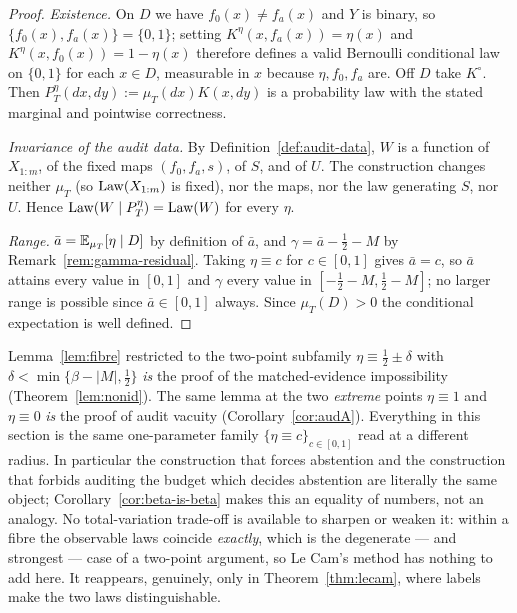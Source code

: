 \begin{proof}
\emph{Existence.} On $D$ we have $f_0(x)\neq f_a(x)$ and $Y$ is binary, so
$\{f_0(x),f_a(x)\}=\{0,1\}$; setting $K^\eta(x,f_a(x))=\eta(x)$ and
$K^\eta(x,f_0(x))=1-\eta(x)$ therefore defines a valid Bernoulli conditional law on
$\{0,1\}$ for each $x\in D$, measurable in $x$ because $\eta,f_0,f_a$ are. Off $D$ take
$K^\circ$. Then $P_T^\eta(dx,dy):=\mu_T(dx)K(x,dy)$ is a probability law with the stated
marginal and pointwise correctness.

\emph{Invariance of the audit data.} By Definition~\ref{def:audit-data}, $W$ is a function of
$X_{1:m}$, of the fixed maps $(f_0,f_a,s)$, of $S$, and of $U$. The construction changes
neither $\mu_T$ (so $\mathrm{Law}(X_{1:m})$ is fixed), nor the maps, nor the law generating $S$, nor
$U$. Hence $\mathrm{Law}(W\mid P_T^\eta)=\mathrm{Law}(W)$ for every $\eta$.

\emph{Range.} $\bar a=\mathbb{E}_{\mu_T}[\eta\mid D]$ by definition of $\bar a$, and
$\gamma=\bar a-\tfrac12-M$ by Remark~\ref{rem:gamma-residual}. Taking $\eta\equiv c$ for
$c\in[0,1]$ gives $\bar a=c$, so $\bar a$ attains every value in $[0,1]$ and $\gamma$ every
value in $[-\tfrac12-M,\tfrac12-M]$; no larger range is possible since $\bar a\in[0,1]$
always. Since $\mu_T(D)>0$ the conditional expectation is well defined.
\end{proof}

\begin{remark}\label{rem:one-construction}
Lemma~\ref{lem:fibre} restricted to the two-point subfamily $\eta\equiv\tfrac12\pm\delta$ with
$\delta<\min\{\beta-|M|,\tfrac12\}$ \emph{is} the proof of the matched-evidence impossibility
(Theorem~\ref{lem:nonid}). The same lemma at the two \emph{extreme} points $\eta\equiv1$ and
$\eta\equiv0$ \emph{is} the proof of audit vacuity (Corollary~\ref{cor:audA}). Everything in
this section is the same one-parameter family $\{\eta\equiv c\}_{c\in[0,1]}$ read at a
different radius. In particular the construction that forces abstention and the construction
that forbids auditing the budget which decides abstention are literally the same object;
Corollary~\ref{cor:beta-is-beta} makes this an equality of numbers, not an analogy.
No total-variation trade-off is available to sharpen or weaken it: within a fibre the
observable laws coincide \emph{exactly}, which is the degenerate --- and strongest --- case
of a two-point argument, so Le Cam's method has nothing to add here. It reappears, genuinely,
only in Theorem~\ref{thm:lecam}, where labels make the two laws distinguishable.
\end{remark}

